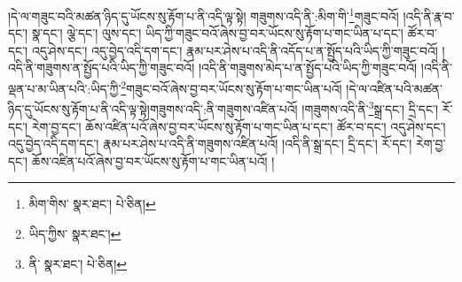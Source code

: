 །དེ་ལ་གཟུང་བའི་མཚན་ཉིད་དུ་ཡོངས་སུ་རྟོག་པ་ནི་འདི་ལྟ་སྟེ། གཟུགས་འདི་ནི་:མིག་གི་\footnote{མིག་གིས་  སྣར་ཐང་།  པེ་ཅིན། }གཟུང་བའོ། །འདི་ནི་རྣ་བ་དང་། སྣ་དང་། ལྕེ་དང་། ལུས་དང་། ཡིད་ཀྱི་གཟུང་བའོ་ཞེས་བྱ་བར་ཡོངས་སུ་རྟོག་པ་གང་ཡིན་པ་དང་། ཚོར་བ་དང་། འདུ་ཤེས་དང་། འདུ་བྱེད་འདི་དག་དང་། རྣམ་པར་ཤེས་པ་འདི་ནི་འདོད་པ་ན་སྤྱོད་པའི་ཡིད་ཀྱི་གཟུང་བའོ། །འདི་ནི་གཟུགས་ན་སྤྱོད་པའི་ཡིད་ཀྱི་གཟུང་བའོ། །འདི་ནི་གཟུགས་མེད་པ་ན་སྤྱོད་པའི་ཡིད་ཀྱི་གཟུང་བའོ། །འདི་ནི་ལྡན་པ་མ་ཡིན་པའི་:ཡིད་ཀྱི་\footnote{ཡིད་ཀྱིས་  སྣར་ཐང་། }གཟུང་བའོ་ཞེས་བྱ་བར་ཡོངས་སུ་རྟོག་པ་གང་ཡིན་པའོ། །དེ་ལ་འཛིན་པའི་མཚན་ཉིད་དུ་ཡོངས་སུ་རྟོག་པ་ནི་འདི་ལྟ་སྟེ།གཟུགས་འདི་:ནི་གཟུགས་འཛིན་པའོ། །གཟུགས་འདི་ནི་\footnote{ནི་  སྣར་ཐང་།  པེ་ཅིན། }སྒྲ་དང་། དྲི་དང་། རོ་དང་། རེག་བྱ་དང་། ཆོས་འཛིན་པའོ་ཞེས་བྱ་བར་ཡོངས་སུ་རྟོག་པ་གང་ཡིན་པ་དང་། ཚོར་བ་དང་། འདུ་ཤེས་དང་། འདུ་བྱེད་འདི་དག་དང་། རྣམ་པར་ཤེས་པ་འདི་ནི་གཟུགས་འཛིན་པའོ། །འདི་ནི་སྒྲ་དང་། དྲི་དང་། རོ་དང་། རེག་བྱ་དང་། ཆོས་འཛིན་པའོ་ཞེས་བྱ་བར་ཡོངས་སུ་རྟོག་པ་གང་ཡིན་པའོ། །
